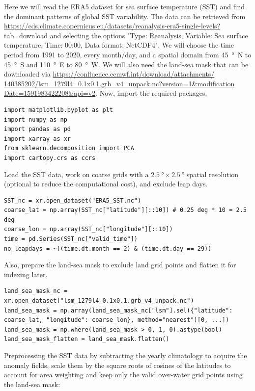 Here we will read the ERA5 dataset for sea surface temperature (SST) and find the dominant patterns of global SST variability. The data can be retrieved from \href{https://cds.climate.copernicus.eu/datasets/reanalysis-era5-single-levels?tab=download}{https://cds.climate.copernicus.eu/datasets/reanalysis-era5-single-levels?tab=download} and selecting the options "Type: Reanalysis, Variable: Sea surface temperature, Time: 00:00, Data format: NetCDF4". We will choose the time period from 1991 to 2020, every month/day, and a spatial domain from \SI{45}{\degree N} to \SI{45}{\degree S} and \SI{110}{\degree E} to \SI{80}{\degree W}. We will also need the land-sea mask that can be downloaded via \href{https://confluence.ecmwf.int/download/attachments/140385202/lsm_1279l4_0.1x0.1.grb_v4_unpack.nc?version=1&modificationDate=1591983422208&api=v2}{https://confluence.ecmwf.int/download/attachments/\\140385202/lsm\_1279l4\_0.1x0.1.grb\_v4\_unpack.nc?version=1\&modification\\Date=1591983422208\&api=v2}. Now, import the required packages.
\begin{lstlisting}
import matplotlib.pyplot as plt
import numpy as np
import pandas as pd
import xarray as xr
from sklearn.decomposition import PCA
import cartopy.crs as ccrs
\end{lstlisting}
Load the SST data, work on coarse grids with a $\SI{2.5}{\degree} \times \SI{2.5}{\degree}$ spatial resolution (optional to reduce the computational cost), and exclude leap days.
\begin{lstlisting}
SST_nc = xr.open_dataset("ERA5_SST.nc")
coarse_lat = np.array(SST_nc["latitude"][::10]) # 0.25 deg * 10 = 2.5 deg
coarse_lon = np.array(SST_nc["longitude"][::10])
time = pd.Series(SST_nc["valid_time"])
no_leapdays = ~((time.dt.month == 2) & (time.dt.day == 29))
\end{lstlisting}
Also, prepare the land-sea mask to exclude land grid points and flatten it for indexing later.
\begin{lstlisting}
land_sea_mask_nc = xr.open_dataset("lsm_1279l4_0.1x0.1.grb_v4_unpack.nc")
land_sea_mask = np.array(land_sea_mask_nc["lsm"].sel({"latitude": coarse_lat, "longitude": coarse_lon}, method="nearest")[0, ...])
land_sea_mask = np.where(land_sea_mask > 0, 1, 0).astype(bool)
land_sea_mask_flatten = land_sea_mask.flatten()
\end{lstlisting}
Preprocessing the SST data by subtracting the yearly climatology to acquire the anomaly fields, scale them by the square roots of cosines of the latitudes to account for area weighting and keep only the valid over-water grid points using the land-sea mask:
